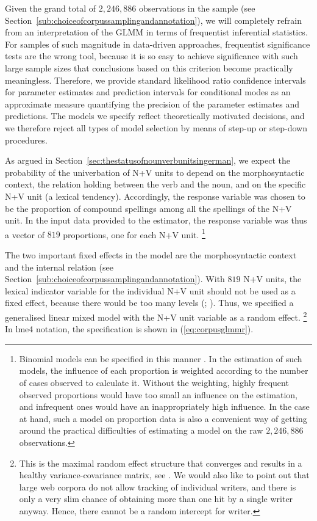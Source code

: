 \documentclass[biblatex, charis, linguex]{glossa}\usepackage{knitr}
\begin{document}
Given the grand total of $2,246,886$ observations in the sample (see Section~\ref{sub:choiceofcorpussamplingandannotation}), we will completely refrain from an interpretation of the GLMM in terms of frequentist inferential statistics.
For samples of such magnitude in data-driven approaches, frequentist significance tests are the wrong tool, because it is so easy to achieve significance with such large sample sizes that conclusions based on this criterion become practically meaningless.
Therefore, we provide standard likelihood ratio confidence intervals for parameter estimates and prediction intervals for conditional modes as an approximate measure quantifying the precision of the parameter estimates and predictions.
The models we specify reflect theoretically motivated decisions, and we therefore reject all types of model selection by means of step-up or step-down procedures.

As argued in Section~\ref{sec:thestatusofnounverbunitsingerman}, we expect the probability of the univerbation of N+V units to depend on the morphosyntactic context, the relation holding between the verb and the noun, and on the specific N+V unit (a lexical tendency).
Accordingly, the response variable was chosen to be the proportion of compound spellings among all the spellings of the N+V unit.
In the input data provided to the estimator, the response variable was thus a vector of $819$ proportions, one for each N+V unit.%
\footnote{Binomial models can be specified in this manner \parencite[245--260]{ZuurEa2009}.
In the estimation of such models, the influence of each proportion is weighted according to the number of cases observed to calculate it.
Without the weighting, highly frequent observed proportions would have too small an influence on the estimation, and infrequent ones would have an inappropriately high influence.
In the case at hand, such a model on proportion data is also a convenient way of getting around the practical difficulties of estimating a model on the raw $2,246,886$ observations.}

The two important fixed effects in the model are the morphosyntactic context and the internal relation (see Section~\ref{sub:choiceofcorpussamplingandannotation}).
With $819$ N+V units, the lexical indicator variable for the individual N+V unit should not be used as a fixed effect, because there would be too many levels (\citealt[244--247]{GelmanHill2006}; \citealt{Schaefer2020a}).
Thus, we specified a generalised linear mixed model with the N+V unit variable as a random effect.%
\footnote{This is the maximal random effect structure that converges and results in a healthy variance-covariance matrix, see \mbox{\citet{Schaefer2020a}}.
We would also like to point out that large web corpora do not allow tracking of individual writers, and there is only a very slim chance of obtaining more than one hit by a single writer anyway.
Hence, there cannot be a random intercept for writer.}
In lme4 notation, the specification is shown in (\ref{eq:corpusglmmr}).
\end{document}
